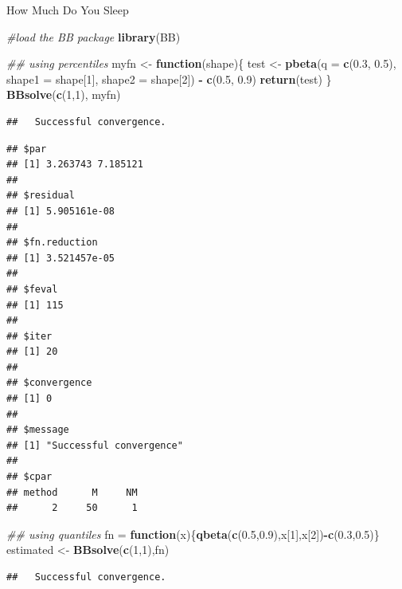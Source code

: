 \documentclass[
  ignorenonframetext,
]{beamer}
\newenvironment{Shaded}{\begin{snugshade}}{\end{snugshade}}
\newcommand{\CommentTok}[1]{\textcolor[rgb]{0.56,0.35,0.01}{\textit{#1}}}
\newcommand{\ControlFlowTok}[1]{\textcolor[rgb]{0.13,0.29,0.53}{\textbf{#1}}}
\newcommand{\DataTypeTok}[1]{\textcolor[rgb]{0.13,0.29,0.53}{#1}}
\newcommand{\DecValTok}[1]{\textcolor[rgb]{0.00,0.00,0.81}{#1}}
\newcommand{\FloatTok}[1]{\textcolor[rgb]{0.00,0.00,0.81}{#1}}
\newcommand{\KeywordTok}[1]{\textcolor[rgb]{0.13,0.29,0.53}{\textbf{#1}}}
\newcommand{\NormalTok}[1]{#1}
\newcommand{\OperatorTok}[1]{\textcolor[rgb]{0.81,0.36,0.00}{\textbf{#1}}}
\newcommand{\StringTok}[1]{\textcolor[rgb]{0.31,0.60,0.02}{#1}}
\begin{document}
\begin{frame}[fragile]{How Much Do You Sleep}
\protect\hypertarget{how-much-do-you-sleep-2}{}

\begin{Shaded}
\begin{Highlighting}[]
\CommentTok{#load the BB package}
\KeywordTok{library}\NormalTok{(BB)}

\CommentTok{## using percentiles}
\NormalTok{myfn <-}\StringTok{ }\ControlFlowTok{function}\NormalTok{(shape)\{}
\NormalTok{    test <-}\StringTok{ }\KeywordTok{pbeta}\NormalTok{(}\DataTypeTok{q =} \KeywordTok{c}\NormalTok{(}\FloatTok{0.3}\NormalTok{, }\FloatTok{0.5}\NormalTok{), }\DataTypeTok{shape1 =}\NormalTok{ shape[}\DecValTok{1}\NormalTok{], }
     \DataTypeTok{shape2 =}\NormalTok{ shape[}\DecValTok{2}\NormalTok{]) }\OperatorTok{-}\StringTok{ }\KeywordTok{c}\NormalTok{(}\FloatTok{0.5}\NormalTok{, }\FloatTok{0.9}\NormalTok{)}
    \KeywordTok{return}\NormalTok{(test)}
\NormalTok{    \}}
\KeywordTok{BBsolve}\NormalTok{(}\KeywordTok{c}\NormalTok{(}\DecValTok{1}\NormalTok{,}\DecValTok{1}\NormalTok{), myfn)}
\end{Highlighting}
\end{Shaded}

\begin{verbatim}
##   Successful convergence.
\end{verbatim}

\begin{verbatim}
## $par
## [1] 3.263743 7.185121
## 
## $residual
## [1] 5.905161e-08
## 
## $fn.reduction
## [1] 3.521457e-05
## 
## $feval
## [1] 115
## 
## $iter
## [1] 20
## 
## $convergence
## [1] 0
## 
## $message
## [1] "Successful convergence"
## 
## $cpar
## method      M     NM 
##      2     50      1
\end{verbatim}

\begin{Shaded}
\begin{Highlighting}[]
\CommentTok{## using quantiles}
\NormalTok{fn =}\StringTok{ }\ControlFlowTok{function}\NormalTok{(x)\{}\KeywordTok{qbeta}\NormalTok{(}\KeywordTok{c}\NormalTok{(}\FloatTok{0.5}\NormalTok{,}\FloatTok{0.9}\NormalTok{),x[}\DecValTok{1}\NormalTok{],x[}\DecValTok{2}\NormalTok{])}\OperatorTok{-}\KeywordTok{c}\NormalTok{(}\FloatTok{0.3}\NormalTok{,}\FloatTok{0.5}\NormalTok{)\}}
\NormalTok{estimated <-}\StringTok{ }\KeywordTok{BBsolve}\NormalTok{(}\KeywordTok{c}\NormalTok{(}\DecValTok{1}\NormalTok{,}\DecValTok{1}\NormalTok{),fn)}
\end{Highlighting}
\end{Shaded}

\begin{verbatim}
##   Successful convergence.
\end{verbatim}

\end{frame}
\end{document}
